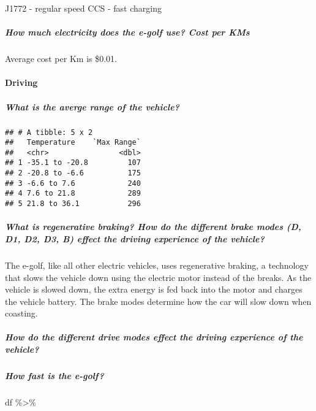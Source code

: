 \documentclass[]{article}
\let\oldparagraph\paragraph
\renewcommand{\paragraph}[1]{\oldparagraph{#1}\mbox{}}
\let\oldsubparagraph\subparagraph
\renewcommand{\subparagraph}[1]{\oldsubparagraph{#1}\mbox{}}
\begin{document}
J1772 - regular speed CCS - fast charging

\hypertarget{how-much-electricity-does-the-e-golf-use-cost-per-kms}{%
\subparagraph{How much electricity does the e-golf use? Cost per
KMs}\label{how-much-electricity-does-the-e-golf-use-cost-per-kms}}

Average cost per Km is \$0.01.

\hypertarget{driving}{%
\paragraph{Driving}\label{driving}}

\hypertarget{what-is-the-averge-range-of-the-vehicle}{%
\subparagraph{What is the averge range of the
vehicle?}\label{what-is-the-averge-range-of-the-vehicle}}

\begin{verbatim}
## # A tibble: 5 x 2
##   Temperature    `Max Range`
##   <chr>                <dbl>
## 1 -35.1 to -20.8         107
## 2 -20.8 to -6.6          175
## 3 -6.6 to 7.6            240
## 4 7.6 to 21.8            289
## 5 21.8 to 36.1           296
\end{verbatim}

\hypertarget{what-is-regenerative-braking-how-do-the-different-brake-modes-d-d1-d2-d3-b-effect-the-driving-experience-of-the-vehicle}{%
\subparagraph{What is regenerative braking? How do the different brake
modes (D, D1, D2, D3, B) effect the driving experience of the
vehicle?}\label{what-is-regenerative-braking-how-do-the-different-brake-modes-d-d1-d2-d3-b-effect-the-driving-experience-of-the-vehicle}}

The e-golf, like all other electric vehicles, uses regenerative braking,
a technology that slows the vehicle down using the electric motor
instead of the breaks. As the vehicle is slowed down, the extra energy
is fed back into the motor and charges the vehicle battery. The brake
modes determine how the car will slow down when coasting.

\hypertarget{how-do-the-different-drive-modes-effect-the-driving-experience-of-the-vehicle}{%
\subparagraph{How do the different drive modes effect the driving
experience of the
vehicle?}\label{how-do-the-different-drive-modes-effect-the-driving-experience-of-the-vehicle}}

\hypertarget{how-fast-is-the-e-golf}{%
\subparagraph{How fast is the e-golf?}\label{how-fast-is-the-e-golf}}

df \%\textgreater{}\%
\end{document}
